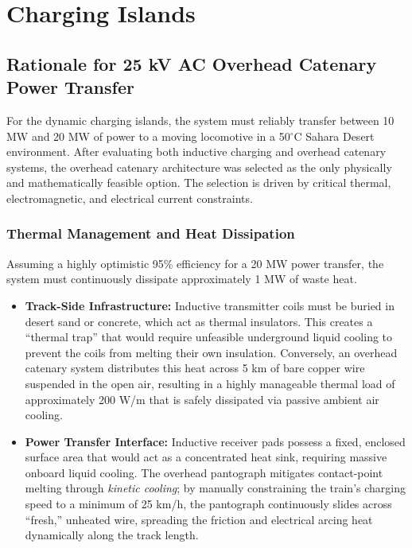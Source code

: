 \section{Charging Islands}


\subsection{Rationale for 25 kV AC Overhead Catenary Power Transfer}

For the dynamic charging islands, the system must reliably transfer between 10 MW and 20 MW of power to a moving locomotive in a 50$^\circ$C Sahara Desert environment. After evaluating both inductive charging and overhead catenary systems, the overhead catenary architecture was selected as the only physically and mathematically feasible option. The selection is driven by critical thermal, electromagnetic, and electrical current constraints.

\subsubsection*{Thermal Management and Heat Dissipation}
Assuming a highly optimistic 95\% efficiency for a 20 MW power transfer, the system must continuously dissipate approximately 1 MW of waste heat. 

\begin{itemize}
    \item \textbf{Track-Side Infrastructure:} Inductive transmitter coils must be buried in desert sand or concrete, which act as thermal insulators. This creates a ``thermal trap'' that would require unfeasible underground liquid cooling to prevent the coils from melting their own insulation. Conversely, an overhead catenary system distributes this heat across 5 km of bare copper wire suspended in the open air, resulting in a highly manageable thermal load of approximately 200 W/m that is safely dissipated via passive ambient air cooling.
    \item \textbf{Power Transfer Interface:} Inductive receiver pads possess a fixed, enclosed surface area that would act as a concentrated heat sink, requiring massive onboard liquid cooling. The overhead pantograph mitigates contact-point melting through \textit{kinetic cooling}; by manually constraining the train's charging speed to a minimum of 25 km/h, the pantograph continuously slides across ``fresh,'' unheated wire, spreading the friction and electrical arcing heat dynamically along the track length.
\end{itemize}

